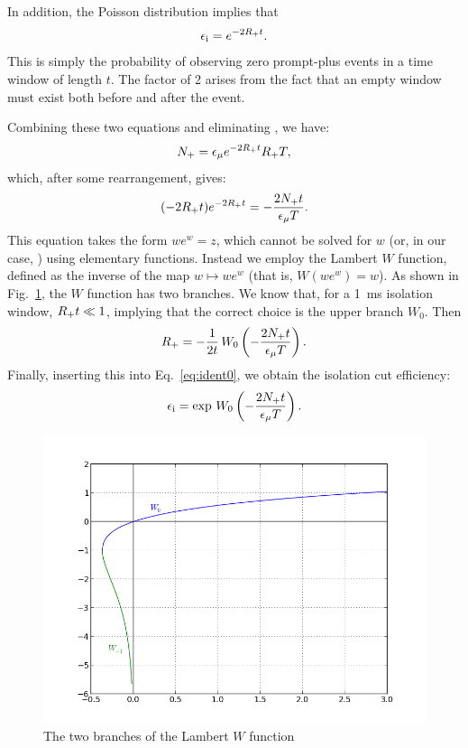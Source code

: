 \documentclass[../thesis.tex]{subfiles}
\begin{document}
In addition, the Poisson distribution implies that
\begin{equation}
  \label{eq:ident1}
  \epsilon_\mathrm{i} = e^{-2R_\mathrm{+} t}.
\end{equation}
This is simply the probability of observing zero prompt-plus events in a time window of length $t$. The factor of 2 arises from the fact that an empty window must exist both before and after the event.

Combining these two equations and eliminating \eisol, we have:
\begin{equation}
  N_\mathrm{+} = \epsilon_\mathrm{\mu} e^{-2R_\mathrm{+} t} R_\mathrm{+} T,
\end{equation}
which, after some rearrangement, gives:
\begin{equation}
  (-2 R_\mathrm{+} t) e^{-2 R_\mathrm{+} t} = - \frac{2 N_\mathrm{+} t}{\epsilon_\mathrm{\mu} T}.
\end{equation}
This equation takes the form $we^w = z$, which cannot be solved for $w$ (or, in our case, \Rplu) using elementary functions. Instead we employ the Lambert $W$ function, defined as the inverse of the map $w \mapsto we^w$ (that is, $W(we^w) = w$). As shown in Fig.~\ref{fig:lambertW}, the $W$ function has two branches. We know that, for a 1~ms isolation window, $R_\mathrm{+} t \ll 1$, implying that the correct choice is the upper branch $W_0$. Then
\begin{equation}
  R_\mathrm{+} = -\frac{1}{2t}\, W_0 \left(-\frac{2N_\mathrm{+} t}{\epsilon_\mathrm{\mu} T}\right).
\end{equation}
Finally, inserting this into Eq.~\ref{eq:ident0}, we obtain the isolation cut efficiency:
\begin{equation}
  \epsilon_\mathrm{i} = \exp \, W_0 \left( -\frac{2N_\mathrm{+} t}{\epsilon_\mathrm{\mu} T} \right).
\end{equation}

\begin{figure}
  \centering
  \includegraphics[scale=0.7]{../images/lambertW.png}
  \caption{The two branches of the Lambert $W$ function}
  \label{fig:lambertW}
\end{figure}
\end{document}
